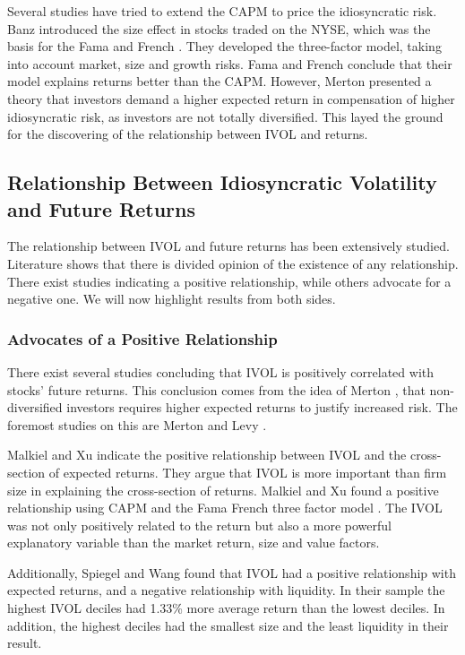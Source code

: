 Several studies have tried to extend the CAPM to price the idiosyncratic risk. Banz \cite{banz} introduced the size effect in stocks traded on the NYSE, which was the basis for the Fama and French \cite{famafrench}. They developed the three-factor model, taking into account market, size and growth risks. Fama and French \cite{famafrench} conclude that their model explains returns better than the CAPM. However, Merton \cite{merton87} presented a theory that investors demand a higher expected return in compensation of higher idiosyncratic risk, as investors are not totally diversified. This layed the ground for the discovering of the relationship between IVOL and returns.

\subsection{Relationship Between Idiosyncratic Volatility and Future Returns}
The relationship between IVOL and future returns has been extensively studied. Literature shows that there is divided opinion of the existence of any relationship. There exist studies indicating a positive relationship, while others advocate for a negative one. We will now highlight results from both sides.

\subsubsection{Advocates of a Positive Relationship}
There exist several studies concluding that IVOL is positively correlated with stocks' future returns. This conclusion comes from the idea of Merton \cite{merton87}, that non-diversified investors requires higher expected returns to justify increased risk. The foremost studies on this are Merton \cite{merton73} and Levy \cite{levy}.

Malkiel and Xu \cite{malkielxu02} indicate the positive relationship between IVOL and the cross-section of expected returns. They argue that IVOL is more important than firm size in explaining the cross-section of returns. Malkiel and Xu \cite{malkielxu04} found a positive relationship using CAPM and the Fama French three factor model \cite{famafrench}. The IVOL was not only positively related to the return but also a more powerful explanatory variable than the market return, size and value factors.
 
Additionally, Spiegel and Wang \cite{spiegelwang} found that IVOL had a positive relationship with expected returns, and a negative relationship with liquidity. In their sample the highest IVOL deciles had 1.33\% more average return than the lowest deciles. In addition, the highest deciles had the smallest size and the least liquidity in their result. 

